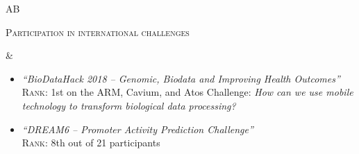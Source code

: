\documentclass[a4paper,10pt]{article}
\newenvironment{doubletablelist}
{
	\vspace{-0.2cm}
	\begin{longtable}[!h]{AB}}{\end{longtable}
}
\newcommand{\dtlist}[2]{
\hspace{-3cm}
\noindent
	\begin{minipage}{0.22\textwidth}
	\begin{flushright}
	\textsc{#1}
	\end{flushright}
	\end{minipage}
	& #2\\[0.2cm]
}
\newcommand{\graybulletitem}{ \item[\textcolor{gray}{$\bullet$}]}
\newcommand{\minusitem}{\item[-]}
\begin{document}
\begin{doubletablelist}


%
%
%


\dtlist{Participation in international challenges}{
	\vspace{-1.0cm}
	\begin{itemize} %
		\graybulletitem   \begin{minipage}[t]{0.65\textwidth}
			\emph{``BioDataHack 2018 -- Genomic, Biodata and Improving Health Outcomes''}\\
			\textsc{Rank:} 1st on the ARM, Cavium, and Atos Challenge: \emph{How can we use mobile technology to transform biological data processing?}
		\end{minipage}
	
		\graybulletitem  \begin{minipage}[t]{0.65\textwidth}
			\emph{``DREAM6 -- Promoter Activity Prediction Challenge''}\\
			\textsc{Rank:} 8th out of 21 participants
		\end{minipage}


\end{itemize}}
\end{doubletablelist}
\end{document}

